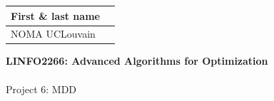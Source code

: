 \documentclass[12pt]{report}
\newcommand{\answerbox}[2]{\hfill\break\\
	\framebox[\linewidth]{\parbox[c][#1][c]{\dimexpr\linewidth-2\fboxsep-2\fboxrule}{#2}}
}
\begin{document}
	\hfill
	\begingroup
	\Large
	\begin{tabular}{|l|p{6cm}|}
		\hline
		First \& last name &
		\\ \hline
		NOMA UCLouvain &
		\\ \hline
	\end{tabular}
	\endgroup
	\vspace{1.5cm}

	\noindent
	\begingroup
	\Large
	\textbf{LINFO2266: Advanced Algorithms for Optimization}\\\\
	Project 6: MDD
	\endgroup
	\vspace{0.2cm}

\end{document}

